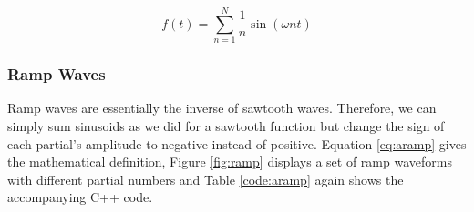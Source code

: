   \begin{equation}
    f(t) = \sum\limits_{n=1}^N \frac{1}{n} \sin(\omega n t)
    \label{eq:asaw}
  \end{equation}

  \begin{figure}[h!]

    \TopFloatBoxes

    \begin{floatrow}



    \end{floatrow}

  \end{figure}

  \pagebreak

  \subsubsection{Ramp Waves}

  Ramp waves are essentially the inverse of sawtooth waves. Therefore, we can simply sum sinusoids as we did for a sawtooth function but change the sign of each partial's amplitude to negative instead of positive. Equation \ref{eq:aramp} gives the mathematical definition, Figure \ref{fig:ramp} displays a set of ramp waveforms with different partial numbers and Table \ref{code:aramp} again shows the accompanying C++ code.

